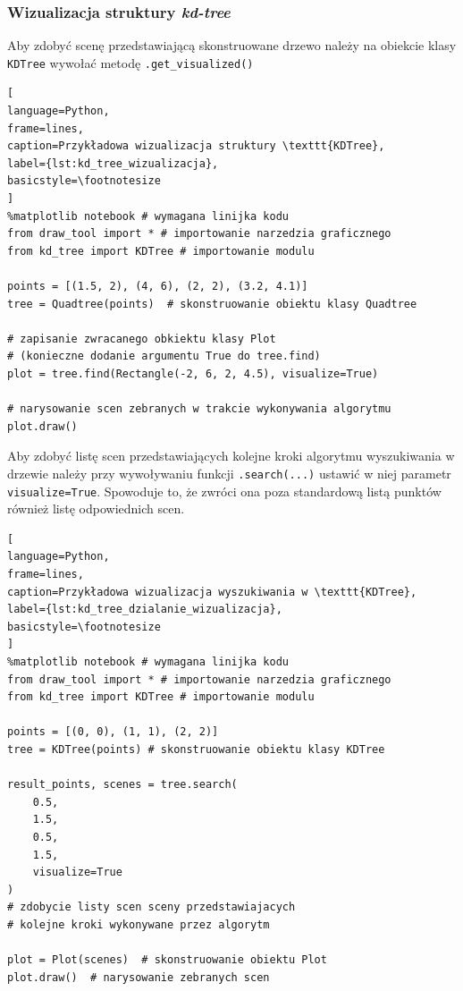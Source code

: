 \documentclass{article}
\begin{document}
\subsubsection{Wizualizacja struktury \textit{kd-tree}}

Aby zdobyć scenę przedstawiającą skonstruowane drzewo należy na obiekcie klasy \texttt{KDTree} wywołać metodę \texttt{.get\_visualized()}

\begin{lstlisting}[
language=Python,
frame=lines,
caption=Przykładowa wizualizacja struktury \texttt{KDTree},
label={lst:kd_tree_wizualizacja},
basicstyle=\footnotesize
]
%matplotlib notebook # wymagana linijka kodu
from draw_tool import * # importowanie narzedzia graficznego
from kd_tree import KDTree # importowanie modulu

points = [(1.5, 2), (4, 6), (2, 2), (3.2, 4.1)]
tree = Quadtree(points)  # skonstruowanie obiektu klasy Quadtree

# zapisanie zwracanego obkiektu klasy Plot
# (konieczne dodanie argumentu True do tree.find)
plot = tree.find(Rectangle(-2, 6, 2, 4.5), visualize=True)

# narysowanie scen zebranych w trakcie wykonywania algorytmu 
plot.draw()
\end{lstlisting}

Aby zdobyć listę scen przedstawiających kolejne kroki algorytmu wyszukiwania w drzewie należy przy wywoływaniu funkcji \texttt{.search(...)} ustawić w niej parametr \texttt{visualize=True}. Spowoduje to, że zwróci ona poza standardową listą punktów również listę odpowiednich scen.

\begin{lstlisting}[
language=Python,
frame=lines,
caption=Przykładowa wizualizacja wyszukiwania w \texttt{KDTree},
label={lst:kd_tree_dzialanie_wizualizacja},
basicstyle=\footnotesize
]
%matplotlib notebook # wymagana linijka kodu
from draw_tool import * # importowanie narzedzia graficznego
from kd_tree import KDTree # importowanie modulu

points = [(0, 0), (1, 1), (2, 2)]
tree = KDTree(points) # skonstruowanie obiektu klasy KDTree

result_points, scenes = tree.search(
    0.5, 
    1.5, 
    0.5, 
    1.5, 
    visualize=True
) 
# zdobycie listy scen sceny przedstawiajacych 
# kolejne kroki wykonywane przez algorytm

plot = Plot(scenes)  # skonstruowanie obiektu Plot
plot.draw()  # narysowanie zebranych scen
\end{lstlisting}
\end{document}

